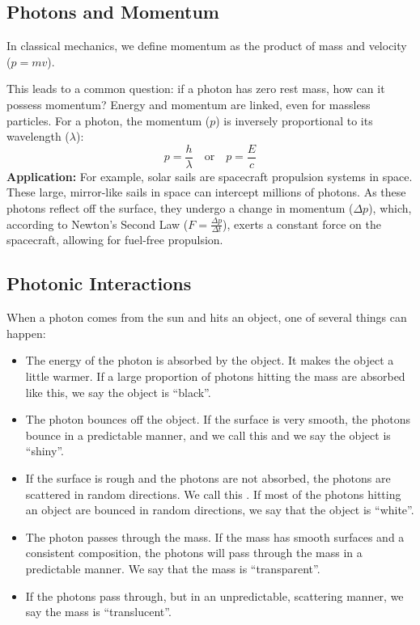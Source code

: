 \subsection{Photons and Momentum}
In classical mechanics, we define momentum as the product of mass and velocity ($p = mv$). 

This leads to a common question: if a photon has zero rest mass, how can it possess momentum? Energy and momentum are linked, even for massless particles. For a photon, the momentum ($p$) is inversely proportional to its wavelength ($\lambda$):
\begin{equation}
  p = \frac{h}{\lambda} \quad \text{or} \quad p = \frac{E}{c}
  \label{eq:photon_momentum}
\end{equation}
\textbf{Application:}
For example, solar sails are spacecraft propulsion systems in space. These large, mirror-like sails in space can intercept millions of photons. As these photons reflect off the surface, they undergo a change in momentum ($\Delta p$), which, according to Newton's Second Law ($F = \frac{\Delta p}{\Delta t}$), exerts a constant force on the spacecraft, allowing for fuel-free propulsion. 
\subsection*{Photonic Interactions}
When a photon comes from the sun and hits an object, one of several
things can happen:

\begin{itemize}

  \item The energy of the photon is absorbed by the object. It makes the
        object a little warmer. If a large proportion of photons hitting the
        mass are absorbed like this, we say the object is ``black''.

  \item The photon bounces off the object. If the surface is very
        smooth, the photons bounce in a predictable manner, and we call
        this  and we say the object is ``shiny''.

  \item If the surface is rough and the photons are not absorbed, the
        photons are scattered in random directions. We call this
        . If most of the photons hitting an object are
        bounced in random directions, we say that the object is ``white''.

  \item The photon passes through the mass. If the mass has smooth
        surfaces and a consistent composition, the photons will pass through the
        mass in a predictable manner. We say that the mass is ``transparent''.

  \item If the photons pass through, but in an unpredictable,
        scattering manner, we say the mass is ``translucent''. 

\end{itemize}

